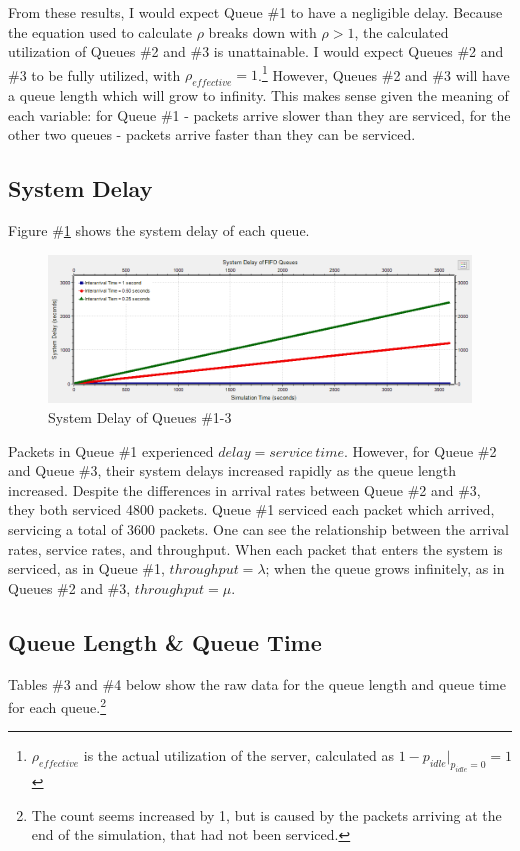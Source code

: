 \documentclass{article}
\begin{document}
From these results, I would expect Queue \#1 to have a negligible delay.  
Because the equation used to calculate $\rho$ breaks down with $\rho > 1$, the calculated utilization of Queues \#2 and \#3 is unattainable.  
I would expect Queues \#2 and \#3 to be fully utilized, with $\rho_{effective} = 1$.\footnote{$\rho_{effective}$ is the actual utilization of the server, calculated as $1-p_{idle}|_{p_{idle}=0}=1$}
However, Queues \#2 and \#3 will have a queue length which will grow to infinity.
This makes sense given the meaning of each variable:  for Queue \#1 - packets arrive slower than they are serviced, for the other two queues - packets arrive faster than they can be serviced.

\subsection*{System Delay}
Figure \#\ref{DelayPlot} shows the system delay of each queue.

\begin{figure}[h!]
	\begin{center}
	\includegraphics[scale=0.65]{Images/DelayPlot.PNG}
	\vspace{-.25cm}
	\caption{System Delay of Queues \#1-3}
	\label{DelayPlot}
	\end{center}
\end{figure}

Packets in Queue \#1 experienced $delay = service \, time$.  
However, for Queue \#2 and Queue \#3, their system delays increased rapidly as the queue length increased.  
Despite the differences in arrival rates between Queue \#2 and \#3, they both serviced 4800 packets.  
Queue \#1 serviced each packet which arrived, servicing a total of 3600 packets.
One can see the relationship between the arrival rates, service rates, and throughput.
When each packet that enters the system is serviced, as in Queue \#1, $throughput = \lambda$; when the queue grows infinitely, as in Queues \#2 and \#3, $throughput = \mu$.

\newpage
\subsection*{Queue Length \& Queue Time}
Tables \#3 and \#4 below show the raw data for the queue length and queue time for each queue.\footnote{The count seems increased by 1, but is caused by the packets arriving at the end of the simulation, that had not been serviced.}
\vspace{.25cm}
\end{document}
